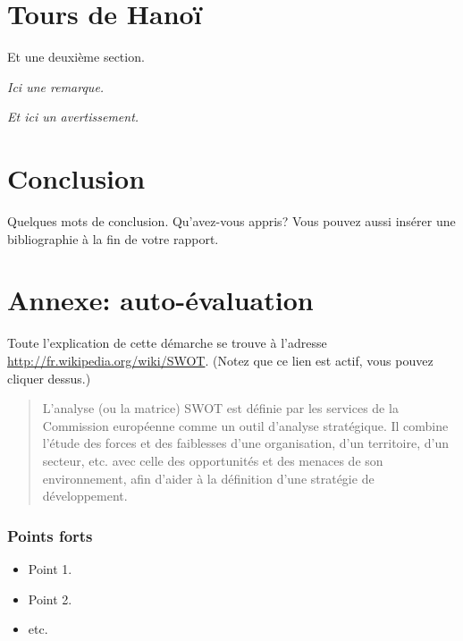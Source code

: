 \documentclass[a4paper,11pt]{article}%
\newenvironment{remarque}%
{\description\item[Remarque.]\sl}%
{\enddescription}
\newcommand{\dbend}{{\manual\char127}}
\newenvironment{attention}%
{\description\item[\dbend]\sl}%
{\enddescription}
\begin{document}
\section{Tours de Hanoï}

Et une deuxième section.

\begin{remarque}
  Ici une remarque.
\end{remarque}

\begin{attention}
  Et ici un avertissement.
\end{attention}

\section{Conclusion}

Quelques mots de conclusion. Qu'avez-vous appris? Vous pouvez aussi insérer une bibliographie à la fin de votre rapport.

\clearpage %

\appendix %

\section{Annexe: auto-évaluation}

Toute l'explication de cette démarche se trouve à l'adresse
\url{http://fr.wikipedia.org/wiki/SWOT}. (Notez que ce lien est actif,
vous pouvez cliquer dessus.)
\begin{quotation}
  L'analyse (ou la matrice) SWOT est définie par les services de la
  Commission européenne comme un outil d'analyse stratégique. Il
  combine l'étude des forces et des faiblesses d'une organisation,
  d'un territoire, d'un secteur, etc. avec celle des opportunités et
  des menaces de son environnement, afin d'aider à la définition
  d'une stratégie de développement.
\end{quotation}

\subsubsection*{Points forts}
\begin{itemize}
\item Point 1.
\item Point 2.
\item etc.
\end{itemize}
\end{document}
